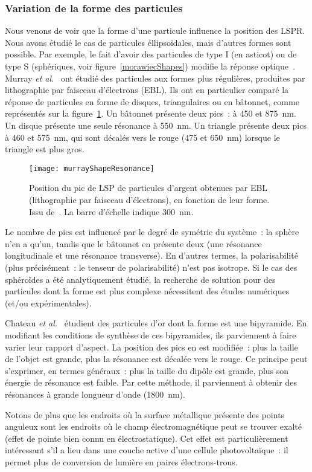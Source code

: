 		\subsubsection{Variation de la forme des particules}
Nous venons de voir que la forme d'une particule influence la position des LSPR. Nous avons étudié le cas de particules éllipsoïdales, mais d'autres formes sont possible. Par exemple, le fait d'avoir des particules de type I (en asticot) ou de type S (sphériques, voir figure~\ref{morawiecShapes}) modifie la réponse optique~\cite{morawiec2013self, tan2013micro}. Murray \textit{et al.}~\cite{murray2007plasmonic} ont étudié des particules aux formes plus régulières, produites par lithographie par faisceau d'électrons (EBL). Ils ont en particulier comparé la réponse de particules en forme de disques, triangulaires ou en bâtonnet, comme représentés sur la figure~\ref{murrayShapeResonance}. Un bâtonnet présente deux pics~: à 450 et 875~nm. Un disque présente une seule résonance à 550~nm. Un triangle présente deux pics à 460 et 575~nm, qui sont décalés vers le rouge (475 et 650~nm) lorsque le triangle est plus gros.\par 
\begin{figure}[!htb]
	\centering
	\texttt{[image: murrayShapeResonance]}
	\caption{Position du pic de LSP de particules d'argent obtenues par EBL (lithographie par faisceau d'électrons), en fonction de leur forme. Issu de~\cite{murray2007plasmonic}. La barre d'échelle indique 300~nm.}
	\label{murrayShapeResonance}
\end{figure}
Le nombre de pics est influencé par le degré de symétrie du système~: la sphère n'en a qu'un, tandis que le bâtonnet en présente deux (une résonance longitudinale et une résonance transverse). En d'autres termes, la polarisabilité (plus précisément~: le tenseur de polarisabilité) n'est pas isotrope. Si le cas des sphéroïdes a été analytiquement étudié, la recherche de solution pour des particules dont la forme est plus complexe nécessitent des études numériques (et/ou expérimentales).\par 
Chateau \textit{et al.}~\cite{chateau2015gold} étudient des particules d'or dont la forme est une bipyramide. En modifiant les conditions de synthèse de ces bipyramides, ils parviennent à faire varier leur rapport d'aspect. La position des pics en est modifiée~: plus la taille de l'objet est grande, plus la résonance est décalée vers le rouge. Ce principe peut s'exprimer, en termes généraux~: plus la taille du dipôle est grande, plus son énergie de résonance est faible. Par cette méthode, il parviennent à obtenir des résonances à grande longueur d'onde (1800~nm).\par 
Notons de plus que les endroits où la surface métallique présente des points anguleux  sont les endroits où le champ électromagnétique peut se trouver exalté~\cite{miljkovic2012simulating} (effet de pointe bien connu en électrostatique). Cet effet est particulièrement intéressant s'il a lieu dans une couche active d'une cellule photovoltaïque~: il permet plus de conversion de lumière en paires électrons-trous.\par 

